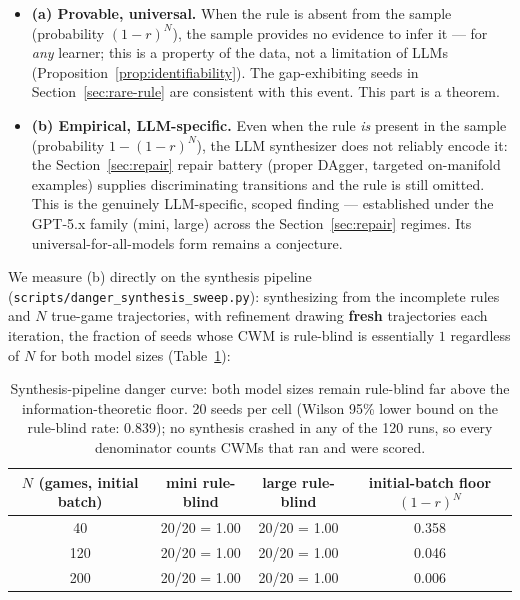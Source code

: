 \documentclass[11pt]{article}
\theoremstyle{remark}
\begin{document}
\begin{itemize}
\item \textbf{(a) Provable, universal.} When the rule is absent from the sample (probability $(1-r)^N$), the sample provides no evidence to infer it --- for \emph{any} learner; this is a property of the data, not a limitation of LLMs (Proposition~\ref{prop:identifiability}). The gap-exhibiting seeds in Section~\ref{sec:rare-rule} are consistent with this event. This part is a theorem.
\item \textbf{(b) Empirical, LLM-specific.} Even when the rule \emph{is} present in the sample (probability $1-(1-r)^N$), the LLM synthesizer does not reliably encode it: the Section~\ref{sec:repair} repair battery (proper DAgger, targeted on-manifold examples) supplies discriminating transitions and the rule is still omitted. This is the genuinely LLM-specific, scoped finding --- established under the GPT-5.x family (mini, large) across the Section~\ref{sec:repair} regimes. Its universal-for-all-models form remains a conjecture.
\end{itemize}

We measure (b) directly on the synthesis pipeline (\texttt{scripts/danger\_synthesis\_sweep.py}): synthesizing from the incomplete rules and $N$ true-game trajectories, with refinement drawing \textbf{fresh} trajectories each iteration, the fraction of seeds whose CWM is rule-blind is essentially $1$ regardless of $N$ for both model sizes (Table~\ref{tab:synthcurve}):

\begin{table}[ht]
\centering
\small
\begin{tabular}{cccc}
\toprule
$N$ (games, initial batch) & mini rule-blind & large rule-blind & initial-batch floor $(1-r)^N$ \\
\midrule
40  & 20/20 = 1.00 & 20/20 = 1.00 & 0.358 \\
120 & 20/20 = 1.00 & 20/20 = 1.00 & 0.046 \\
200 & 20/20 = 1.00 & 20/20 = 1.00 & 0.006 \\
\bottomrule
\end{tabular}
\caption{Synthesis-pipeline danger curve: both model sizes remain rule-blind far above the information-theoretic floor. 20 seeds per cell (Wilson 95\% lower bound on the rule-blind rate: 0.839); no synthesis crashed in any of the 120 runs, so every denominator counts CWMs that ran and were scored.}
\label{tab:synthcurve}
\end{table}
\end{document}
